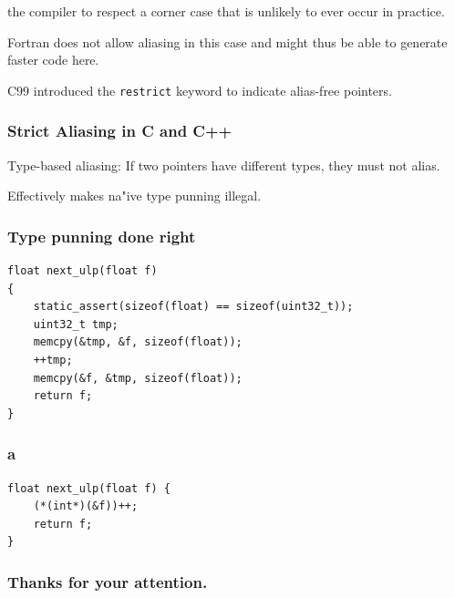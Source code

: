 \documentclass[aspectratio=169]{beamer}
\begin{document}
\begin{frame}[fragile]
the compiler to respect a corner case that is unlikely to ever occur in practice.

  Fortran does not allow aliasing in this case and might thus be able to generate faster code here.

  C99 introduced the \texttt{restrict} keyword to indicate alias-free pointers.
\end{frame}


\begin{frame}
  \frametitle{Strict Aliasing in C and C++}

  Type-based aliasing: If two pointers have different types, they must not alias.

  Effectively makes na"ive type punning illegal.
\end{frame}

\begin{frame}[fragile]
  \frametitle{Type punning done right}

  \begin{lstlisting}
float next_ulp(float f)
{
    static_assert(sizeof(float) == sizeof(uint32_t));
    uint32_t tmp;
    memcpy(&tmp, &f, sizeof(float));
    ++tmp;
    memcpy(&f, &tmp, sizeof(float));
    return f;
}
  \end{lstlisting}
\end{frame}


\begin{frame}[fragile]
  \frametitle{a}

  \begin{lstlisting}
float next_ulp(float f) {
    (*(int*)(&f))++;
    return f;
}
  \end{lstlisting}
\end{frame}



\begin{frame}
  \frametitle{Thanks for your attention.}
\end{frame}
\end{document}
